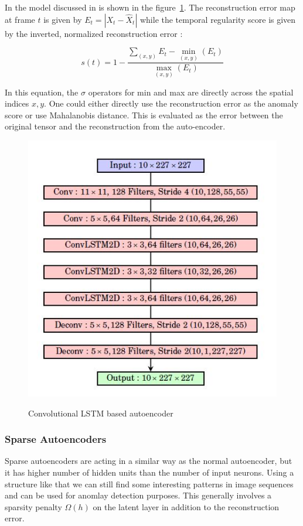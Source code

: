 \documentclass[a4paper,12pt]{report}
\begin{document}
\begin{itemize}
In the model discussed in \cite{Chong2017} is shown in the figure~\ref{fig:CLSTMAE}. The reconstruction error map at frame $t$ is given by $E _ { t } = \left| X _ { t } - \hat { X } _ { t } \right|$ while the temporal regularity score is given by the inverted, normalized reconstruction error :

\begin{equation}
    s ( t ) = 1 - \frac { \sum _ { ( x , y ) } E _ { t } - \min _ { ( x , y ) } \left( E _ { t } \right) } { \max _ { ( x , y ) } \left( E _ { t } \right) }
\end{equation}

In this equation, the $\sigma$ operators for min and max are directly across the spatial indices $x,y$. One could either directly use the reconstruction error as the anomaly score or use Mahalanobis distance. This is evaluated as the error between the original tensor and the reconstruction from the auto-encoder.

\begin{figure}[H]
\caption{Convolutional LSTM based autoencoder}
\includegraphics [scale=1]{images/ConvLSTMAE.JPG}
\centering
\label{fig:CLSTMAE}
\end{figure}

\subsubsection{Sparse Autoencoders}
Sparse autoencoders are acting in a similar way as the normal autoencoder, but it has higher number of hidden units than the number of input neurons. Using a structure like that we can still find some interesting patterns in image sequences and can be used for anomlay detection purposes. This generally involves a sparsity penalty $\Omega(h)$ on the latent layer in addition to the reconstruction error.


\end{itemize}
\end{document}
